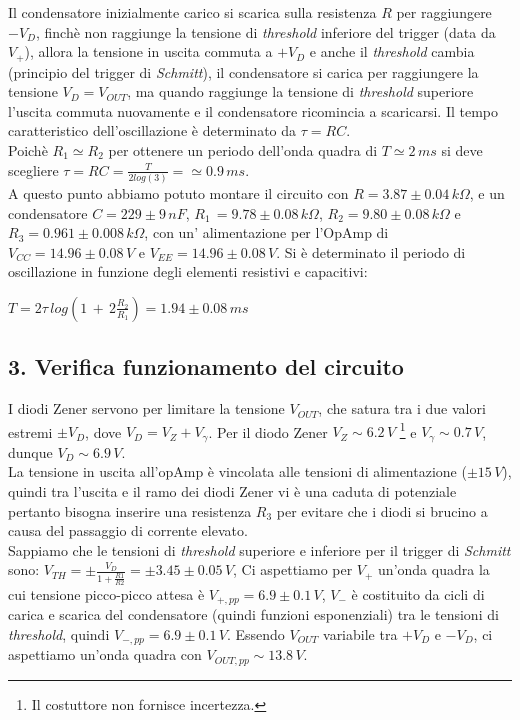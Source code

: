 \documentclass[10pt,a4paper]{article}
\begin{document}
Il condensatore inizialmente carico si scarica sulla resistenza $R$ per raggiungere $-V_D$, finchè non raggiunge la tensione di \emph{threshold} inferiore del trigger (data da $V_{+}$), allora la tensione in uscita commuta a $+V_{D}$ e anche il \emph{threshold} cambia (principio del trigger di \emph{Schmitt}), il condensatore si carica per raggiungere la tensione $V_D = V_{OUT}$, ma quando raggiunge la tensione di \emph{threshold} superiore l'uscita commuta nuovamente e il condensatore ricomincia a scaricarsi. Il tempo caratteristico dell'oscillazione è determinato da $\tau = RC$.\\


Poichè $R_1 \simeq R_2$ per ottenere un periodo dell'onda quadra di $T \simeq 2 \, ms$ si deve scegliere $\tau = RC = \frac{T}{2 log(3)} = \simeq 0.9\,ms$.\\
A questo punto abbiamo potuto montare il circuito con $R = 3.87 \pm 0.04 \, k\Omega$, e un condensatore $C = 229 \pm 9 \, nF$, $R_1\,= 9.78\pm0.08 \, k\Omega $, $R_2 = 9.80\pm0.08\, k\Omega $ e $R_3 = 0.961\pm0.008 \, k\Omega $, con un' alimentazione per l'OpAmp di $V_{CC} = 14.96\pm0.08 \, V$ e $V_{EE} = 14.96 \pm 0.08 \, V$.
Si è determinato il periodo di oscillazione in funzione degli elementi resistivi e capacitivi: 
\begin{center}
$T=2\tau\, log\left( 1\,+\,2\frac{R_2}{R_1}\right) = 1.94 \pm 0.08 \, ms$ 
\end{center}

\subsection*{3. Verifica funzionamento del circuito}

I diodi Zener servono per limitare la tensione $V_{OUT}$, che satura tra i due valori estremi $\pm V_{D}$, dove $V_{D} = V_{Z} + V_{ \gamma}$. Per il diodo Zener $V_Z \sim 6.2 \, V$ \footnote{Il costuttore non fornisce incertezza.} e $V_{\gamma} \sim 0.7\, V$, dunque $V_D \sim 6.9 \, V$. \\
La tensione in uscita all'opAmp è vincolata alle tensioni di alimentazione ($\pm 15 \, V$), quindi tra l'uscita e il ramo dei diodi Zener vi è una caduta di potenziale pertanto bisogna inserire una resistenza $R_3$ per evitare che i diodi si brucino a causa del passaggio di corrente elevato. \\ 

Sappiamo che le tensioni di \emph{threshold} superiore e inferiore per il trigger di \emph{Schmitt} sono: $V_{TH} = \pm \frac{V_{D}}{1+\frac{R1}{R2}} = \pm 3.45 \pm 0.05 \, V$, 
Ci aspettiamo per $V_{+}$ un'onda quadra la cui tensione picco-picco attesa è $V_{+, pp} = 6.9 \pm 0.1 \, V$, $V_{-}$ è costituito da cicli di carica e scarica del condensatore (quindi funzioni esponenziali) tra le tensioni di \emph{threshold}, quindi $V_{-, pp} = 6.9 \pm 0.1 \, V$. Essendo $V_{OUT}$ variabile tra $+V_{D}$ e $-V_{D}$, ci aspettiamo un'onda quadra con $V_{OUT, pp} \sim 13.8 \, V$.
\end{document}
